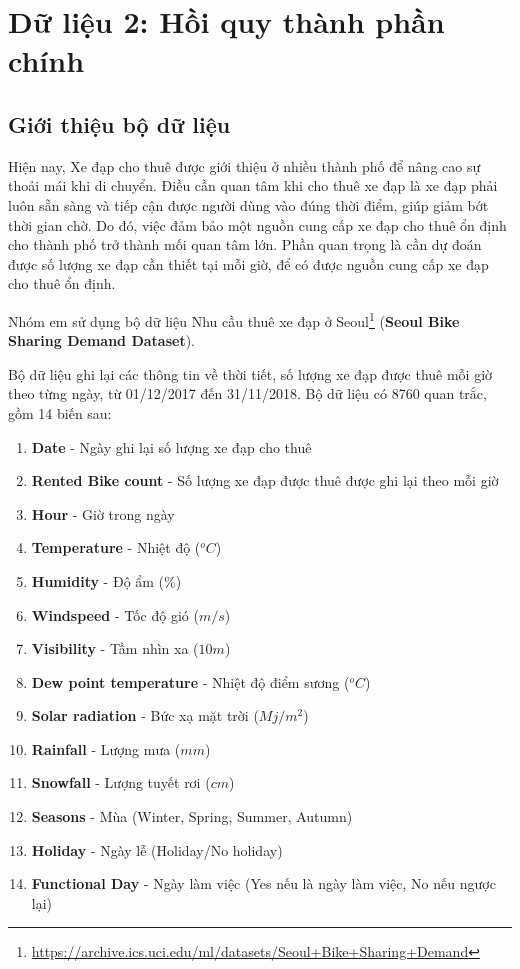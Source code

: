 \section{Dữ liệu 2: Hồi quy thành phần chính}

\subsection*{Giới thiệu bộ dữ liệu}
Hiện nay, Xe đạp cho thuê được giới thiệu ở nhiều thành phố để nâng cao sự thoải mái khi di chuyển. Điều cần quan tâm khi cho thuê xe đạp là xe đạp phải luôn sẵn sàng và tiếp cận được người dùng vào đúng thời điểm, giúp giảm bớt thời gian chờ. Do đó, việc đảm bảo một nguồn cung cấp xe đạp cho thuê ổn định cho thành phố trở thành mối quan tâm lớn. Phần quan trọng là cần dự đoán được số lượng xe đạp cần thiết tại mỗi giờ, để có được nguồn cung cấp xe đạp cho thuê ổn định.

Nhóm em sử dụng bộ dữ liệu Nhu cầu thuê xe đạp ở Seoul\footnote{\url{https://archive.ics.uci.edu/ml/datasets/Seoul+Bike+Sharing+Demand}} (\textbf{Seoul Bike Sharing Demand Dataset}).

Bộ dữ liệu ghi lại các thông tin về thời tiết, số lượng xe đạp được thuê mỗi giờ theo từng ngày, từ 01/12/2017 đến 31/11/2018. Bộ dữ liệu có 8760 quan trắc, gồm 14 biến sau:
\begin{enumerate}
	\item \textbf{Date} - Ngày ghi lại số lượng xe đạp cho thuê
	\item \textbf{Rented Bike count} - Số lượng xe đạp được thuê được ghi lại theo mỗi giờ
	\item \textbf{Hour} - Giờ trong ngày
	\item \textbf{Temperature} - Nhiệt độ ($^o C$)
	\item \textbf{Humidity} - Độ ẩm (\%)
	\item \textbf{Windspeed} - Tốc độ gió ($m/s$)
	\item \textbf{Visibility} - Tầm nhìn xa ($10m$)
	\item \textbf{Dew point temperature} - Nhiệt độ điểm sương ($^o C$)
	\item \textbf{Solar radiation} - Bức xạ mặt trời ($Mj/m^2$)
	\item \textbf{Rainfall} - Lượng mưa ($mm$)
	\item \textbf{Snowfall} - Lượng tuyết rơi ($cm$)
	\item \textbf{Seasons} - Mùa (Winter, Spring, Summer, Autumn)
	\item \textbf{Holiday} - Ngày lễ (Holiday/No holiday)
	\item \textbf{Functional Day} - Ngày làm việc (Yes nếu là ngày làm việc, No nếu ngược lại)
\end{enumerate}

